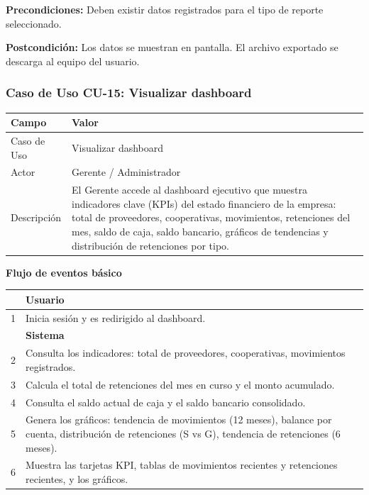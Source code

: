\documentclass[stu]{apa7}
\begin{document}
\vspace{0.3cm}

\textbf{Precondiciones:} Deben existir datos registrados para el tipo de reporte seleccionado.

\textbf{Postcondición:} Los datos se muestran en pantalla. El archivo exportado se descarga al equipo del usuario.

\newpage

\subsubsection{Caso de Uso CU-15: Visualizar dashboard}

\begin{tabularx}{\textwidth}{|l|X|}
\hline
\rowcolor[gray]{0.9}
\textbf{Campo} & \textbf{Valor} \\
\hline
Caso de Uso & Visualizar dashboard \\
\hline
Actor & Gerente / Administrador \\
\hline
Descripción & El Gerente accede al dashboard ejecutivo que muestra indicadores clave (KPIs) del estado financiero de la empresa: total de proveedores, cooperativas, movimientos, retenciones del mes, saldo de caja, saldo bancario, gráficos de tendencias y distribución de retenciones por tipo. \\
\hline
\end{tabularx}

\vspace{0.3cm}

\textbf{Flujo de eventos básico}

\begin{tabularx}{\textwidth}{|c|X|}
\hline
& \textbf{Usuario} \\
\hline
1 & Inicia sesión y es redirigido al dashboard. \\
\hline
& \textbf{Sistema} \\
\hline
2 & Consulta los indicadores: total de proveedores, cooperativas, movimientos registrados. \\
\hline
3 & Calcula el total de retenciones del mes en curso y el monto acumulado. \\
\hline
4 & Consulta el saldo actual de caja y el saldo bancario consolidado. \\
\hline
5 & Genera los gráficos: tendencia de movimientos (12 meses), balance por cuenta, distribución de retenciones (S vs G), tendencia de retenciones (6 meses). \\
\hline
6 & Muestra las tarjetas KPI, tablas de movimientos recientes y retenciones recientes, y los gráficos. \\
\hline
\end{tabularx}
\end{document}
